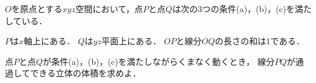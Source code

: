 \documentclass[../../main.tex]{subfiles}
\begin{document}
$O$を原点とする$xyz$空間において，点$P$と点$Q$は次の3つの条件(a)，(b)，(c)を満たしている．
\begin{enumerate}
  $P$は$x$軸上にある．
  $Q$は$yz$平面上にある．
  $OP$と線分$OQ$の長さの和は1である．
\end{enumerate}
点$P$と点$Q$が条件(a)，(b)，(c)を満たしながらくまなく動くとき，
線分$PQ$が通過してできる立体の体積を求めよ．
\end{document}
